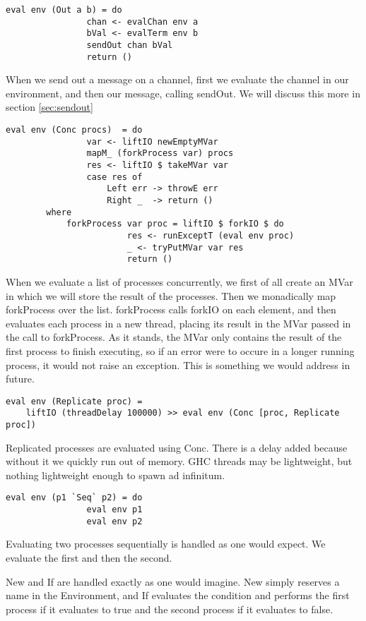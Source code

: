 \begin{verbatim}
eval env (Out a b) = do 
                chan <- evalChan env a
                bVal <- evalTerm env b
                sendOut chan bVal
                return ()
\end{verbatim}
When we send out a message on a channel, first we evaluate the channel in our environment, and then our message, calling sendOut. We will discuss this more in section \ref{sec:sendout}
\begin{verbatim}
eval env (Conc procs)  = do
                var <- liftIO newEmptyMVar 
                mapM_ (forkProcess var) procs
                res <- liftIO $ takeMVar var
                case res of
                    Left err -> throwE err
                    Right _  -> return ()
        where
            forkProcess var proc = liftIO $ forkIO $ do
                        res <- runExceptT (eval env proc)
                        _ <- tryPutMVar var res
                        return ()
\end{verbatim}
When we evaluate a list of processes concurrently, we first of all create an MVar in which we will store the result of the processes. Then we monadically map forkProcess over the list. forkProcess calls forkIO on each element, and then evaluates each process in a new thread, placing its result in the MVar passed in the call to forkProcess. As it stands, the MVar only contains the result of the first process to finish executing, so if an error were to occure in a longer running process, it
would not raise an exception. This is something we would address in future. 

\begin{verbatim}
eval env (Replicate proc) = 
    liftIO (threadDelay 100000) >> eval env (Conc [proc, Replicate proc])
\end{verbatim}
Replicated processes are evaluated using Conc. There is a delay added because without it we quickly run out of memory. GHC threads may be lightweight, but nothing lightweight enough to spawn ad infinitum.

\begin{verbatim}
eval env (p1 `Seq` p2) = do
                eval env p1
                eval env p2
\end{verbatim}
Evaluating two processes sequentially is handled as one would expect. We evaluate the first and then the second.

New and If are handled exactly as one would imagine. New simply reserves a name in the Environment, and If evaluates the condition and performs the first process if it evaluates to true and the second process if it evaluates to false.


